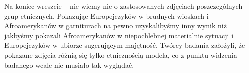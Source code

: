\documentclass{psychol}
\begin{document}
Na koniec wreszcie -- nie wiemy nic o zastosowanych zdjęciach poszczególnych grup etnicznych. Pokazując Europejczyków w brudnych wioskach i Afroamerykanów w garniturach na pewno uzyskalibyśmy inny wynik niż jakbyśmy pokazali Afroamerykanów w niepochlebnej materialnie sytuacji i Europejczyków w ubiorze sugerującym majętność. Twórcy badania założyli, że pokazane zdjęcia różnią się tylko etnicznością modela, co z punktu widzenia badanego wcale nie musiało tak wyglądać.
\end{document}
